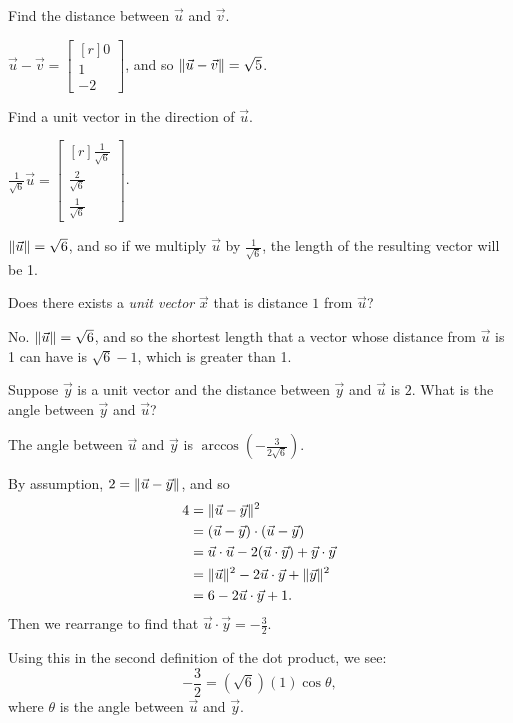\documentclass{problemset}
\newcommand{\mat}[1]{\begin{bmatrix*}[r]#1\end{bmatrix*}}
\DeclarePairedDelimiter\norm{\lVert}{\rVert}
\begin{document}
	\begin{parts}
		\item Find the distance between $\vec u$ and $\vec v$.
			\begin{solution}
				$\vec u - \vec v = \mat{0\\1\\-2}$, and so $\norm{\vec u-\vec v} = \sqrt{5}$.
			\end{solution}
		\item Find a unit vector in the direction of $\vec u$.
			\begin{solution}
				$\frac{1}{\sqrt{6}} \vec u = \mat{\frac{1}{\sqrt{6}}\\\frac{2}{\sqrt{6}}\\\frac{1}{\sqrt{6}}}$.

				$\norm{\vec u} = \sqrt{6}$, and so if we multiply $\vec u$ by $\frac{1}{\sqrt{6}}$,
				the length of the resulting vector will be 1.
			\end{solution}
		\item Does there exists a \emph{unit vector} $\vec x$ that is distance
			$1$ from $\vec u$?
			\begin{solution}
				No. $\norm{\vec u} = \sqrt{6}$, and so the shortest length that a
				vector whose distance from $\vec u$ is 1 can have is $\sqrt{6} - 1$,
				which is greater than 1.
			\end{solution}
		\item Suppose $\vec y$ is a unit vector and the distance between $\vec y$
			and	$\vec u$ is $2$. What is the angle between $\vec y$ and $\vec u$?
			\begin{solution}
				The angle between $\vec u$ and $\vec y$ is $\arccos\left(-\frac{3}{2\sqrt{6}}\right)$.

				By assumption, $2=\norm{\vec u-\vec y}$, and so
				\begin{align*}
					4 &= \norm{\vec u-\vec y}^2\\
					&= (\vec u-\vec y)\cdot(\vec u-\vec y)\\
					&= \vec u\cdot\vec u - 2(\vec u\cdot\vec y) + \vec y\cdot\vec y\\
					&=\norm{\vec u}^2 - 2\vec u\cdot\vec y + \norm{\vec y}^2\\
					&=6 - 2\vec u\cdot\vec y + 1.
				\end{align*}
				Then we rearrange to find that $\vec u\cdot \vec y = -\frac{3}{2}$.

				Using this in the second definition of the dot product, we see:
				\[
					-\frac{3}{2} = \left(\sqrt{6}\right)(1) \cos \theta,
				\]
				where $\theta$ is the angle between $\vec u$ and $\vec y$.
			\end{solution}
	\end{parts}
\end{document}
